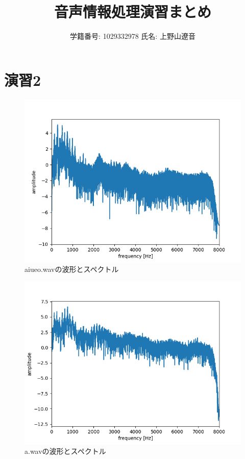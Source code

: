 \documentclass[11pt,a4j]{jarticle}%
\begin{document}
\title{音声情報処理演習まとめ}
\author{学籍番号: 1029332978 氏名: 上野山遼音}
\maketitle
\tableofcontents
\clearpage
\section{演習2}
\begin{figure}[H]
  \centering
  \includegraphics[width=120mm]{img/aiueo-plot-spectrum-whole.png}
  \caption{aiueo.wavの波形とスペクトル}
\end{figure}

\begin{figure}[H]
  \centering
  \includegraphics[width=120mm]{img/a-plot-spectrum-whole.png}
  \caption{a.wavの波形とスペクトル}
\end{figure}
\end{document}
